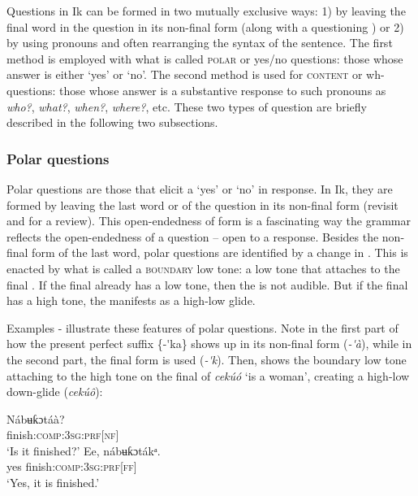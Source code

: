Questions in Ik can be formed in two mutually exclusive ways: 1) by leaving the final word in the question in its non-final form (along with a questioning ) or 2) by using  pronouns and often rearranging the syntax of the sentence. The first method is employed with what is called \textsc{polar} or yes/no questions: those whose answer is either ‘yes’ or ‘no’. The second method is used for \textsc{content} or wh-questions: those whose answer is a substantive response to such  pronouns as \textit{who?}, \textit{what?}, \textit{when?}, \textit{where?}, etc. These two types of question are briefly described in the following two subsections.


\subsubsection{Polar questions}\label{sec:10.4.2}

Polar questions are those that elicit a ‘yes’ or ‘no’ in response. In Ik, they are formed by leaving the last word or  of the question in its non-final form (revisit  and  for a review). This open-endedness of form is a fascinating way the grammar reflects the open-endedness of a question – open to a response. Besides the non-final form of the last word, polar questions are identified by a change in . This   is enacted by what is called a \textsc{boundary} low tone: a low tone that attaches to the final . If the final  already has a low tone, then the  is not audible. But if the final  has a high tone, the  manifests as a high-low glide. 

Examples - illustrate these features of polar questions. Note in the first part of  how the present perfect suffix \{-\'{}ka\} shows up in its non-final form (\textit{{}-\'{}à}), while in the second part, the final form is used (\textit{{}-\'{}k\ᵃ}). Then,  shows the  boundary low tone attaching to the high tone on the final  of \textit{cekúó} ‘is a woman’, creating a high-low down-glide (\textit{cekúô}):




\ea\label{ex:syn:44}
  \ea
  \gll Nábʉƙɔtáà?\\
finish:\textsc{comp:3sg:prf}[\textsc{nf}]  \\
  \glt ‘Is it finished?’    
  \ex
  \gll Ee, nábʉƙɔtákᵃ. \\
     yes finish:\textsc{comp:3sg:prf[ff]}   \\
  \glt ‘Yes, it is finished.’
  \z
\z





